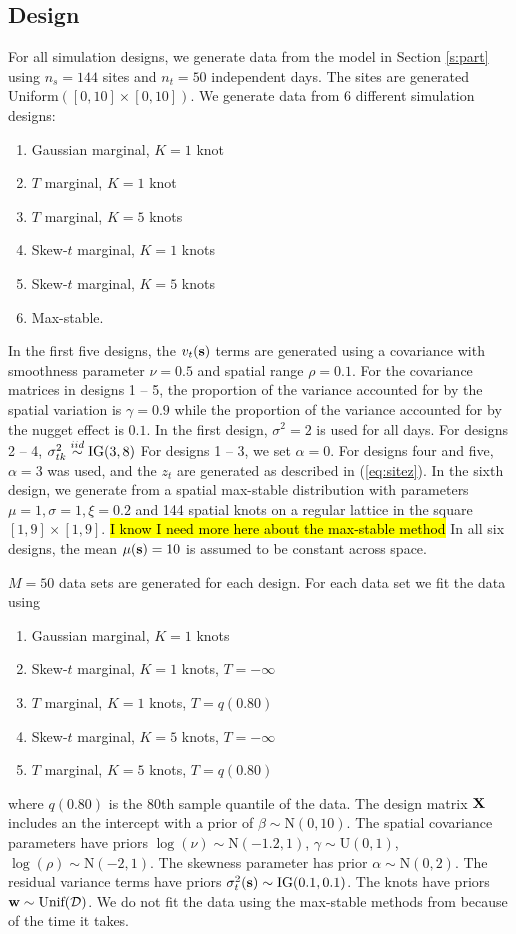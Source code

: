 \documentclass[11pt]{article}
\begin{document}
\subsection{Design}\label{s:simdesign}
For all simulation designs, we generate data from the model in Section \ref{s:part} using $n_s=144$ sites and $n_t=50$ independent days.
The sites are generated Uniform$([0, 10] \times [0, 10])$.
We generate data from 6 different simulation designs:
\begin{enumerate} \setlength{\itemsep}{-0.5em}
  \item Gaussian marginal, $K=1$ knot
  \item $T$ marginal, $K=1$ knot
  \item $T$ marginal, $K=5$ knots
  \item Skew-$t$ marginal, $K=1$ knots
  \item Skew-$t$ marginal, $K=5$ knots
  \item Max-stable.
\end{enumerate}
In the first five designs, the $v_t(\mbox{\bf s})$ terms are generated using a \Matern covariance with smoothness parameter $\nu = 0.5$ and spatial range $\rho = 0.1$.
For the covariance matrices in designs 1 -- 5, the proportion of the variance accounted for by the spatial variation is $\gamma = 0.9$ while the proportion of the variance accounted for by the nugget effect is $0.1$.
In the first design, $\sigma^2 = 2$ is used for all days.
For designs 2 -- 4, $\sigma^2_{tk} \stackrel{iid}{\sim} \text{IG}(3, 8)$
For designs 1 -- 3, we set $\alpha = 0$.
For designs four and five, $\alpha = 3$ was used, and the $z_t$ are generated as described in (\ref{eq:sitez}).
In the sixth design, we generate from a spatial max-stable distribution \citep{Reich2012} with parameters $\mu = 1, \sigma=1, \xi=0.2$ and 144 spatial knots on a regular lattice in the square $[1, 9] \times [1, 9]$.
\hl{I know I need more here about the max-stable method}
In all six designs, the mean $\mu(\mbox{\bf s}) = 10$ is assumed to be constant across space.

$M = 50$ data sets are generated for each design.
For each data set we fit the data using
\begin{enumerate} \setlength{\itemsep}{-0.5em}
  \item Gaussian marginal, $K=1$ knots
  \item Skew-$t$ marginal, $K=1$ knots, $T=-\infty$
  \item $T$ marginal, $K=1$ knots, $T=q(0.80)$
  \item Skew-$t$ marginal, $K=5$ knots, $T=-\infty$
  \item $T$ marginal, $K=5$ knots, $T=q(0.80)$
\end{enumerate}
where $q(0.80)$ is the 80th sample quantile of the data.
The design matrix $\mbox{\bf X}$ includes an the intercept with a prior of $\beta \sim \text{N}(0, 10)$.
The spatial covariance parameters have priors $\log(\nu) \sim \text{N}(-1.2, 1)$, $\gamma \sim \text{U}(0, 1)$, $\log(\rho) \sim \text{N}(-2, 1)$.
The skewness parameter has prior $\alpha \sim \text{N}(0, 2)$.
The residual variance terms have priors $\sigma^2_t(\mbox{\bf s}) \sim \text{IG}(0.1, 0.1)$.
The knots have priors $\mbox{\bf w} \sim \text{Unif}({\cal D})$.
We do not fit the data using the max-stable methods from \citet{Reich2012} because of the time it takes.
\end{document}

